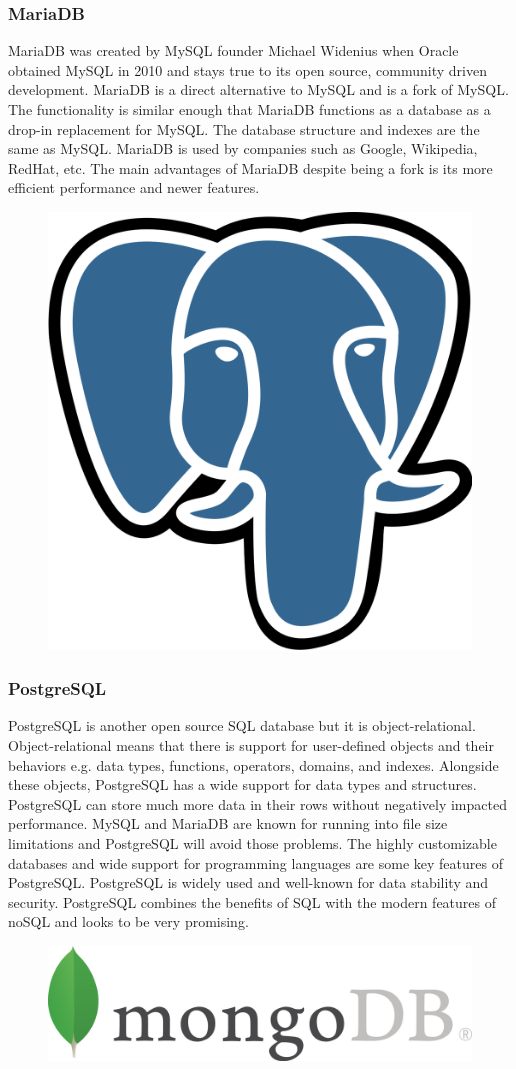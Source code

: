 \documentclass[12pt]{report}
\begin{document}
\subsubsection*{MariaDB}

MariaDB was created by MySQL founder Michael Widenius when Oracle obtained MySQL in 2010 and stays true to its open source, community driven development.  MariaDB is a direct alternative to MySQL and is a fork of MySQL.  The functionality is similar enough that MariaDB functions as a database as a drop-in replacement for MySQL.  The database structure and indexes are the same as MySQL.  MariaDB is used by companies such as Google, Wikipedia, RedHat, etc.  The main advantages of MariaDB despite being a fork is its more efficient performance and newer features.

\begin{figure}[h]
	\centering
	\includegraphics[width=0.251\linewidth]{postgresql}
\end{figure}

\subsubsection*{PostgreSQL}

PostgreSQL is another open source SQL database but it is object-relational.  Object-relational means that there is support for user-defined objects and their behaviors e.g. data types, functions, operators, domains, and indexes.  Alongside these objects, PostgreSQL has a wide support for data types and structures.  PostgreSQL can store much more data in their rows without negatively impacted performance.  MySQL and MariaDB are known for running into file size limitations and PostgreSQL will avoid those problems.  The highly customizable databases and wide support for programming languages are some key features of PostgreSQL.  PostgreSQL is widely used and well-known for data stability and security.  PostgreSQL combines the benefits of SQL with the modern features of noSQL and looks to be very promising.

\begin{figure}[h]
	\centering
	\includegraphics[width=0.251\linewidth]{mongodb}
\end{figure}
\end{document}
